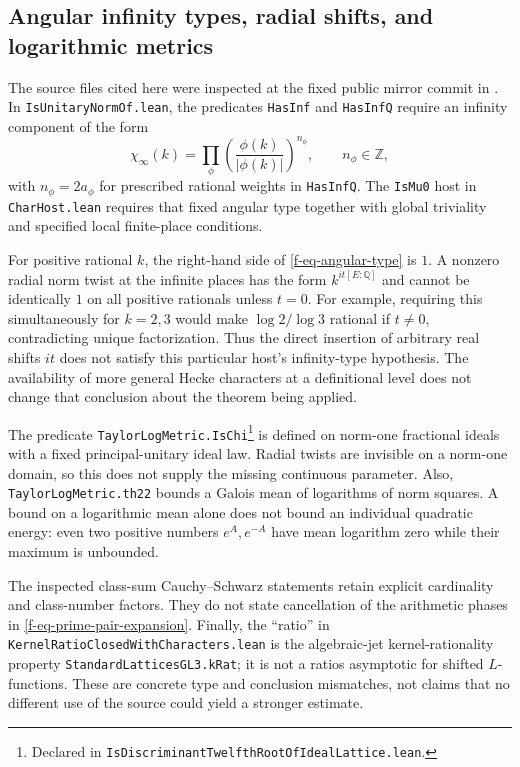 \documentclass[11pt,a4paper]{article}
\theoremstyle{definition}
\theoremstyle{remark}
\begin{document}
\subsection{Angular infinity types, radial shifts, and logarithmic metrics}
\label{f-sub-theta-domain}

The source files cited here were inspected at the fixed public mirror
commit in \cite{f-lean-source}.  In
\texttt{IsUnitaryNormOf.lean}, the predicates \texttt{HasInf} and
\texttt{HasInfQ} require an infinity component of the form
\begin{equation}
 \chi_\infty(k)=\prod_\phi
 \left(\frac{\phi(k)}{|\phi(k)|}\right)^{n_\phi},
 \qquad n_\phi\in\mathbb Z,
 \label{f-eq-angular-type}
\end{equation}
with $n_\phi=2a_\phi$ for prescribed rational weights in
\texttt{HasInfQ}.  The \texttt{IsMu0} host in \texttt{CharHost.lean}
requires that fixed angular type together with global triviality and
specified local finite-place conditions.

For positive rational $k$, the right-hand side of
\eqref{f-eq-angular-type} is $1$.  A nonzero radial norm twist at the
infinite places has the form $k^{it[E:\mathbb Q]}$ and cannot be
identically $1$ on all positive rationals unless $t=0$.  For example,
requiring this simultaneously for $k=2,3$ would make $\log2/\log3$
rational if $t\ne0$, contradicting unique factorization.  Thus the direct
insertion of arbitrary real shifts $it$ does not satisfy this particular
host's infinity-type hypothesis.  The availability of more general Hecke
characters at a definitional level does not change that conclusion about
the theorem being applied.

The predicate \texttt{TaylorLogMetric.IsChi}\footnote{Declared in
\texttt{IsDiscriminantTwelfthRootOfIdealLattice.lean}.} is defined on
norm-one fractional ideals with a fixed principal-unitary ideal law.
Radial twists are invisible on a norm-one domain, so this does not supply
the missing continuous parameter.  Also,
\texttt{TaylorLogMetric.th22} bounds a Galois mean of logarithms of norm
squares.  A bound on a logarithmic mean alone does not bound an individual
quadratic energy: even two positive numbers $e^A,e^{-A}$ have mean
logarithm zero while their maximum is unbounded.

The inspected class-sum Cauchy--Schwarz statements retain explicit
cardinality and class-number factors.  They do not state cancellation of
the arithmetic phases in \eqref{f-eq-prime-pair-expansion}.  Finally, the
``ratio'' in \texttt{KernelRatioClosedWithCharacters.lean} is the
algebraic-jet kernel-rationality property
\texttt{StandardLatticesGL3.kRat}; it is not a ratios asymptotic for shifted
$L$-functions.  These are concrete type and conclusion mismatches, not
claims that no different use of the source could yield a stronger estimate.
\end{document}
